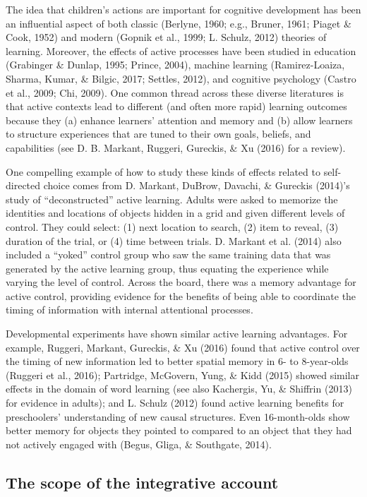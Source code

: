 \documentclass[oneside]{report}
\begin{document}
The idea that children's actions are important for cognitive development
has been an influential aspect of both classic (Berlyne, 1960; e.g.,
Bruner, 1961; Piaget \& Cook, 1952) and modern (Gopnik et al., 1999; L.
Schulz, 2012) theories of learning. Moreover, the effects of active
processes have been studied in education (Grabinger \& Dunlap, 1995;
Prince, 2004), machine learning (Ramirez-Loaiza, Sharma, Kumar, \&
Bilgic, 2017; Settles, 2012), and cognitive psychology (Castro et al.,
2009; Chi, 2009). One common thread across these diverse literatures is
that active contexts lead to different (and often more rapid) learning
outcomes because they (a) enhance learners' attention and memory and (b)
allow learners to structure experiences that are tuned to their own
goals, beliefs, and capabilities (see D. B. Markant, Ruggeri, Gureckis,
\& Xu (2016) for a review).

One compelling example of how to study these kinds of effects related to
self-directed choice comes from D. Markant, DuBrow, Davachi, \& Gureckis
(2014)'s study of ``deconstructed'' active learning. Adults were asked
to memorize the identities and locations of objects hidden in a grid and
given different levels of control. They could select: (1) next location
to search, (2) item to reveal, (3) duration of the trial, or (4) time
between trials. D. Markant et al. (2014) also included a ``yoked''
control group who saw the same training data that was generated by the
active learning group, thus equating the experience while varying the
level of control. Across the board, there was a memory advantage for
active control, providing evidence for the benefits of being able to
coordinate the timing of information with internal attentional
processes.

Developmental experiments have shown similar active learning advantages.
For example, Ruggeri, Markant, Gureckis, \& Xu (2016) found that active
control over the timing of new information led to better spatial memory
in 6- to 8-year-olds (Ruggeri et al., 2016); Partridge, McGovern, Yung,
\& Kidd (2015) showed similar effects in the domain of word learning
(see also Kachergis, Yu, \& Shiffrin (2013) for evidence in adults); and
L. Schulz (2012) found active learning benefits for preschoolers'
understanding of new causal structures. Even 16-month-olds show better
memory for objects they pointed to compared to an object that they had
not actively engaged with (Begus, Gliga, \& Southgate, 2014).

\subsection{The scope of the integrative
account}\label{the-scope-of-the-integrative-account}
\end{document}

